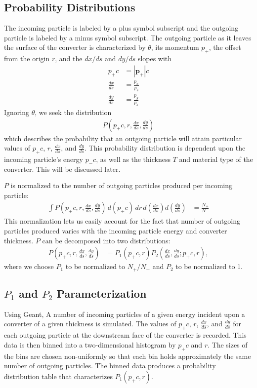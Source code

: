 \documentclass[12pt]{article}
\newcommand{\dxds}{\frac{dx}{ds}}
\newcommand{\dyds}{\frac{dy}{ds}}
\begin{document}
\subsection{Probability Distributions}

The incoming particle is labeled by a plus symbol subscript and the outgoing particle is labeled by
a minus symbol subscript. The outgoing particle as it leaves the surface of the converter is
characterized by $\theta$, its momentum $p_+$, the offset from the origin $r$, and the $dx/ds$ and
$dy/ds$ slopes with
\begin{align}
p_+ c & = \left| \mathbf{p}_+ \right| c \\
\dxds & = \frac{p_x}{p_s} \\
\dyds & = \frac{p_y}{p_s}
\end{align}
Ignoring $\theta$, we seek the distribution
\begin{align}
P \left( p_+ c, r, \dxds, \dyds \right)
\end{align}
which describes the probability that an outgoing particle will attain particular values of $p_+ c$,
$r$, $\dxds$, and $\dyds$. This probability distribution is dependent upon the incoming particle's
energy $p_- c$, as well as the thickness $T$ and material type of the converter. This will be discussed later.

$P$ is normalized to the number of outgoing particles produced per incoming particle:
\begin{align}
\int P \left( p_+ c, r, \dxds, \dyds \right) \, d(p_+ c) \, dr \, d \! \left( \dxds \right) d \! \left( \dyds \right) & = \frac{N_+}{N_-}
\end{align}
This normalization lets us easily account for the fact that number of outgoing particles produced
varies with the incoming particle energy and converter thickness. $P$ can be decomposed into two distributions:
\begin{align}
P \left( p_+ c, r, \dxds, \dyds \right) & = P_1 \left( p_+ c, r \right) P_2 \left( \dxds, \dyds ; p_+ c , r \right),
\end{align}
where we choose $P_1$ to be normalized to $N_+/N_-$ and $P_2$ to be normalized to 1.

\subsection{$P_1$ and $P_2$ Parameterization}

Using Geant\cite{geant}, A number of incoming particles of a given energy incident upon a converter
of a given thickness is simulated.  The values of $p_+ c$, $r$, $\dxds$, and $\dyds$ for each
outgoing particle at the downstream face of the converter is recorded. This data is then binned into
a two-dimensional histogram by $p_+ c$ and $r$. The sizes of the bins are chosen non-uniformly so
that each bin holds approximately the same number of outgoing particles. The binned data produces a
probability distribution table that characterizes $P_1(p_+c, r)$.
\end{document}
